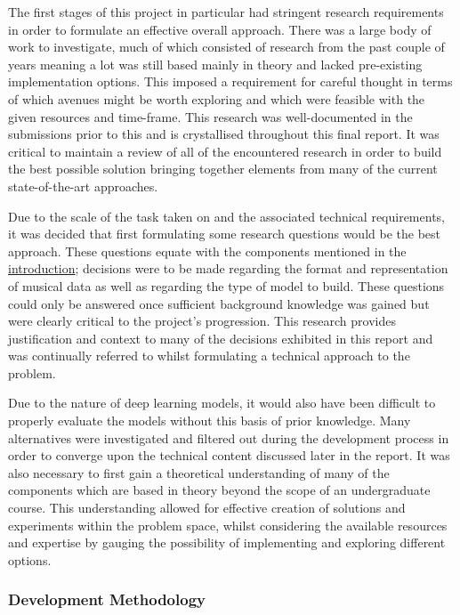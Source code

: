 \documentclass[12pt,]{article}
\begin{document}
The first stages of this project in particular had stringent research
requirements in order to formulate an effective overall approach. There
was a large body of work to investigate, much of which consisted of
research from the past couple of years meaning a lot was still based
mainly in theory and lacked pre-existing implementation options. This
imposed a requirement for careful thought in terms of which avenues
might be worth exploring and which were feasible with the given
resources and time-frame. This research was well-documented in the
submissions prior to this and is crystallised throughout this final
report. It was critical to maintain a review of all of the encountered
research in order to build the best possible solution bringing together
elements from many of the current state-of-the-art approaches.

Due to the scale of the task taken on and the associated technical
requirements, it was decided that first formulating some research
questions would be the best approach. These questions equate with the
components mentioned in the
\protect\hyperlink{introduction}{introduction}; decisions were to be
made regarding the format and representation of musical data as well as
regarding the type of model to build. These questions could only be
answered once sufficient background knowledge was gained but were
clearly critical to the project's progression. This research provides
justification and context to many of the decisions exhibited in this
report and was continually referred to whilst formulating a technical
approach to the problem.

Due to the nature of deep learning models, it would also have been
difficult to properly evaluate the models without this basis of prior
knowledge. Many alternatives were investigated and filtered out during
the development process in order to converge upon the technical content
discussed later in the report. It was also necessary to first gain a
theoretical understanding of many of the components which are based in
theory beyond the scope of an undergraduate course. This understanding
allowed for effective creation of solutions and experiments within the
problem space, whilst considering the available resources and expertise
by gauging the possibility of implementing and exploring different
options.

\hypertarget{development-methodology}{%
\subsubsection{Development Methodology}\label{development-methodology}}
\end{document}
